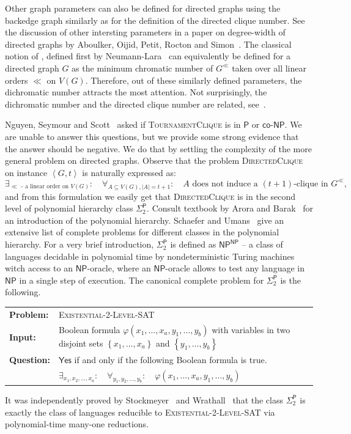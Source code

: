 \documentclass[a4paper,USenglish,cleveref,autoref,thm-restate,pdfa]{lipics-v2021}
\makeatletter
\newcommand{\defproblem}[4]{
  \begin{tcolorbox}%
    \nolinenumbers
    \hspace{0ex}\hspace*{-2.8ex}
    \begin{minipage}{0.99\textwidth}
      \vspace{0ex}\vspace*{-1ex}
      \begin{tabular}{@{}l@{~~}p{0.9\textwidth}@{}}
        {\sf\bfseries\color{gray} Problem:} & #1\\[.1ex]
        {\sf\bfseries\color{gray} Input:} & #2\\[.1ex]
        {\sf\bfseries\color{gray} #4:} & #3\\[-1ex]
      \end{tabular}
    \end{minipage}
  \end{tcolorbox}
}
\newcommand{\defdecproblem}[3]{\defproblem{#1}{#2}{#3}{Question}}
\newcommand{\POL}{\ensuremath{\mathsf{P}}\xspace}
\newcommand{\NP}{\ensuremath{\mathsf{NP}}\xspace}
\newcommand{\CONP}{\ensuremath{\mathsf{co}\text{-}\mathsf{NP}}\xspace}
\newcommand{\PHS}[1]{\ensuremath{\Sigma^\mathsf{P}_{#1}}\xspace}
\newcommand{\SPTWO}{\PHS{2}}
\newcommand{\Pdirclique}{\textsc{DirectedClique}\xspace}
\newcommand{\Ptourclique}{\textsc{TournamentClique}\xspace}
\newcommand{\PSPTWOSAT}{\textsc{Existential-}2\textsc{-Level-SAT}\xspace}
\newcommand{\abrac}[1]{\left\langle#1\right\rangle}
\newcommand{\set}[1]{\left\{#1\right\}}
\newcommand{\norm}[1]{\left|#1\right|}
\let\emph\relax\DeclareTextFontCommand{\emph}{\color{dark blue}\em}
\makeatother
\begin{document}
Other graph parameters can also be defined for directed graphs using the backedge graph similarly as for the definition of the directed clique number.
See the discussion of other intersting parameters in a paper on degree-width of directed graphs by Aboulker, Oijid, Petit, Rocton and Simon~\cite{AboulkerOPRS24}.
The classical notion of \emph{dichromatic number}, defined first by Neumann-Lara~\cite{Neumann82} can equivalently be defined for a directed graph $G$ as the minimum chromatic number of $G^\ll$ taken over all linear orders $\ll$ on $V(G)$.
Therefore, out of these similarly defined parameters, the dichromatic number attracts the most attention.
Not surprisingly, the dichromatic number and the directed clique number are related, see~\cite{NguyenSS25,AboulkerACL23,Aubian24,AboulkerOPRS24}.

Nguyen, Seymour and Scott~\cite{NguyenSS25} asked if \Ptourclique is in \POL or \CONP.
We are unable to answer this questions, but we provide some strong evidence that the answer should be negative.
We do that by settling the complexity of the more general problem on directed graphs.
Observe that the problem \Pdirclique on instance $\abrac{G,t}$ is naturally expressed as:
\[
  \exists_{\ll\text{ - a linear order on $V(G)$}}:\quad\forall_{A\subseteq V(G),\norm{A}= t+1}:\quad \text{$A$ does not induce a $(t+1)$-clique in $G^\ll$}\text{,}
\]
and from this formulation we easily get that \Pdirclique is in the second level of polynomial hierarchy class \SPTWO.
Consult textbook by Arora and Barak~\cite[Chapter~5]{AroraB09} for an introduction of the polynomial hierarchy.
Schaefer and Umans~\cite{SchaeferU02_1,SchaeferU02_2,SchaeferU08} give an extensive list of complete problems for different classes in the polynomial hierarchy.
For a very brief introduction, \SPTWO is defined as $\NP^\NP$ -- a class of languages decidable in polynomial time by nondeterministic Turing machines witch access to an \NP-oracle,
where an \NP-oracle allows to test any language in \NP in a single step of execution.
The canonical complete problem for \SPTWO is the following.
\defdecproblem{\PSPTWOSAT}{Boolean formula $\varphi(x_1,\ldots,x_a,y_1,\ldots,y_b)$ with variables in two disjoint sets $\set{x_1,\ldots,x_a}$ and $\set{y_1,\ldots,y_b}$}{$\mathsf{Yes}$ if and only if the following Boolean formula is true.\\
    &$\exists_{x_1,x_2,\ldots,x_a}:\quad \forall_{y_1,y_2,\ldots,y_b}:\quad \varphi(x_1,\ldots,x_a,y_1,\ldots,y_b)$
    }
It was independently proved by Stockmeyer~\cite{Stockmeyer76} and Wrathall~\cite{Wrathall76} that the class \SPTWO is exactly the class of languages reducible to \PSPTWOSAT via polynomial-time many-one reductions.
\end{document}
